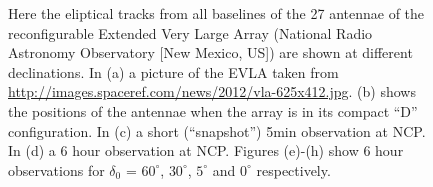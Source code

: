 \begin{figure}[h]
\begin{mdframed}
\begin{subfigure}[b]{0.32\textwidth}
  \caption{}
 \end{subfigure}
 \caption[u,v coverage]{Here the eliptical tracks from all baselines of the 27 antennae of the reconfigurable 
  Extended Very Large Array (National Radio Astronomy Observatory [New Mexico, US]) are shown at different declinations.
  In (a) a picture of the EVLA taken from \url{http://images.spaceref.com/news/2012/vla-625x412.jpg}. (b) shows the positions of the
  antennae when the array is in its compact ``D'' configuration. In (c) a 
  short (``snapshot'') 5min observation at NCP. In (d) a 6 hour observation at NCP. Figures (e)-(h) show 6 hour 
  observations for $\delta_0$ = $60^{\circ}$, $30^{\circ}$, $5^{\circ}$ and $0^{\circ}$ respectively.}
  \label{fig_evla_observation}
 \end{mdframed}
\end{figure}      
